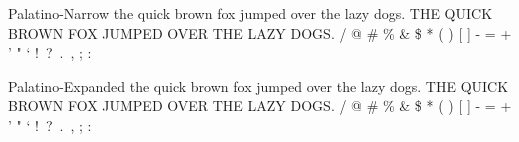 \documentclass{article}
\begin{document}
{{\selectfont
Palatino-Narrow \newline
the quick brown fox jumped over the lazy dogs. \newline
THE QUICK BROWN FOX JUMPED OVER THE LAZY DOGS.  / @ \# \% \& \$ * ( ) [ ] - = + ' " ` !\ ?\ .\ , ; : } \par
{\selectfont
Palatino-Expanded \newline
the quick brown fox jumped over the lazy dogs. \newline
THE QUICK BROWN FOX JUMPED OVER THE LAZY DOGS.  / @ \# \% \& \$ * ( ) [ ] - = + ' " ` !\ ?\ .\ , ; : }} \par
\newpage
\end{document}

